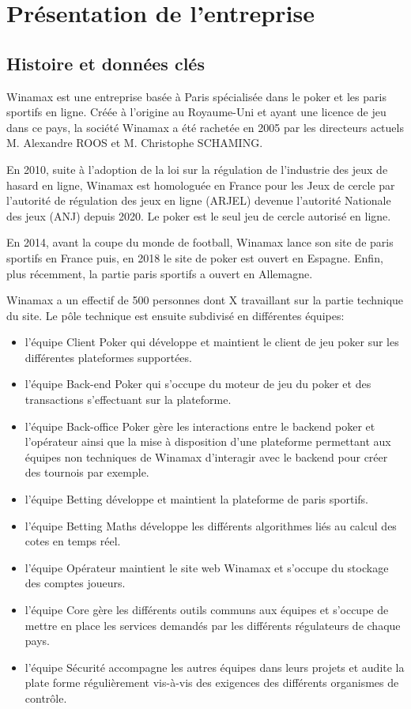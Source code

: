 \chapter{Présentation de l'entreprise}

\section{Histoire et données clés}

Winamax est une entreprise basée à Paris spécialisée dans le poker et les
paris sportifs en ligne. Créée à l’origine au Royaume-Uni et ayant une licence de jeu
dans ce pays, la société Winamax a été rachetée en 2005 par les directeurs actuels
M. Alexandre ROOS et M. Christophe SCHAMING.

En 2010, suite à l’adoption de la loi sur la régulation de l’industrie des jeux
de hasard en ligne, Winamax est homologuée en France pour les Jeux de cercle par
l’autorité de régulation des jeux en ligne (ARJEL) devenue l’autorité Nationale des
jeux (ANJ) depuis 2020. Le poker est le seul jeu de cercle autorisé en ligne.

En 2014, avant la coupe du monde de football, Winamax lance son site de
paris sportifs en France puis, en 2018 le site de poker est ouvert en Espagne. Enfin,
plus récemment, la partie paris sportifs a ouvert en Allemagne.

Winamax a un effectif de 500 personnes dont X travaillant sur la partie
technique du site. Le pôle technique est ensuite subdivisé en différentes équipes:

\begin{itemize}
	\item l’équipe Client Poker qui développe et maintient le client de jeu poker sur les différentes plateformes supportées.
	\item l’équipe Back-end Poker qui s’occupe du moteur de jeu du poker et des transactions s’effectuant sur la plateforme.
	\item l’équipe Back-office Poker gère les interactions entre le backend poker et l’opérateur ainsi que la mise à disposition d’une plateforme permettant aux équipes non techniques de Winamax d’interagir avec le backend pour créer des tournois par exemple.
	\item l’équipe Betting développe et maintient la plateforme de paris sportifs.
	\item l’équipe Betting Maths développe les différents algorithmes liés au calcul des cotes en temps réel.
	\item l’équipe Opérateur maintient le site web Winamax et s’occupe du stockage des comptes joueurs.
	\item l’équipe Core gère les différents outils communs aux équipes et s’occupe de mettre en place les services demandés par les différents régulateurs de chaque pays.
	\item l’équipe Sécurité accompagne les autres équipes dans leurs projets et audite la plate forme régulièrement vis-à-vis des exigences des différents organismes de contrôle.
\end{itemize}

